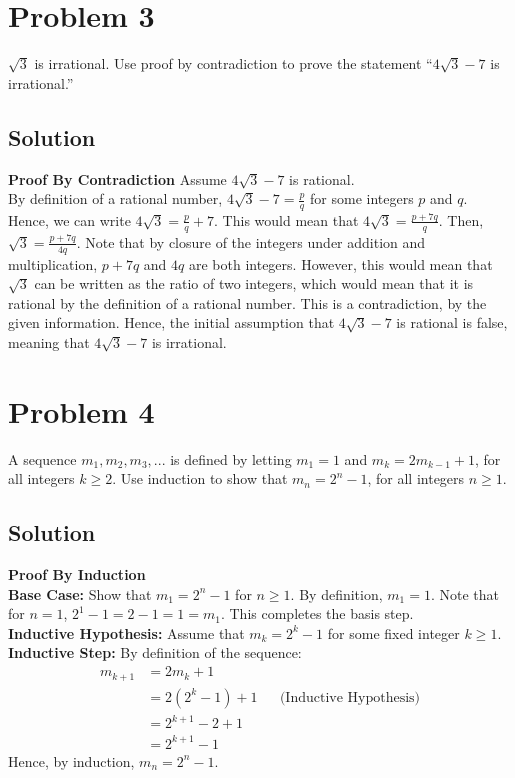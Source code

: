 \documentclass[table]{article}
\begin{document}
\section{Problem 3}
$\sqrt{3}$ is irrational. Use proof by contradiction to prove the statement ``$4\sqrt{3} - 7$ is irrational.''
\subsection{Solution}
\textbf{Proof By Contradiction}
Assume $4\sqrt{3} - 7$ is rational.\\
By definition of a rational number, $4\sqrt{3} - 7 = \frac{p}{q}$ for some integers $p$ and $q$. Hence, we can write $4\sqrt{3} = \frac{p}{q} + 7$. This would mean that $4\sqrt{3} = \frac{p+7q}{q}$. Then, $\sqrt{3} = \frac{p+7q}{4q}$. Note that by closure of the integers under addition and multiplication, $p+7q$ and $4q$ are both integers. However, this would mean that $\sqrt{3}$ can be written as the ratio of two integers, which would mean that it is rational by the definition of a rational number. This is a contradiction, by the given information. Hence, the initial assumption that $4\sqrt{3} - 7$ is rational is false, meaning that $4\sqrt{3} - 7$ is irrational.
\section{Problem 4}
A sequence $m_1, m_2, m_3, ...$ is defined by letting $m_1 = 1$ and $m_k = 2m_{k-1} + 1$, for all integers $k \geq 2$. Use induction to show that $m_n = 2^n - 1$, for all integers $n \geq 1$.
\subsection{Solution}
\textbf{Proof By Induction}\\
\textbf{Base Case:} Show that $m_1 = 2^n-1$ for $n \geq 1$. By definition, $m_1 = 1$. Note that for $n=1$, $2^1-1=2-1=1=m_1$. This completes the basis step.\\
\textbf{Inductive Hypothesis:} Assume that $m_k = 2^k-1$ for some fixed integer $k \geq 1$.\\
\textbf{Inductive Step:} By definition of the sequence:
\begin{align*}
m_{k+1}
&= 2m_k+1\\
&= 2(2^k-1)+1 && \text{(Inductive Hypothesis)}\\
&= 2^{k+1} - 2 + 1\\
&= 2^{k+1} - 1
\end{align*}
Hence, by induction, $m_n = 2^n-1$.
\end{document}
